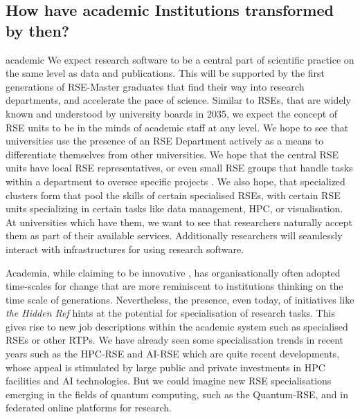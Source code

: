 \documentclass{eceasst}
\begin{document}
\subsection{How have academic Institutions transformed by then?}
\begin{whatis}{}{academic}
We expect research software to be a central part of scientific practice on the same level as data and publications.
This will be supported by the first generations of RSE-Master graduates that find their way into research departments, and accelerate the pace of science.
Similar to RSEs, that are widely known and understood by university boards in 2035, we expect the concept of RSE units to be in the minds
of academic staff at any level.
We hope to see that universities use the presence of an RSE Department actively as a means to differentiate themselves from other universities.
We hope that the central RSE units have local RSE representatives, or even small RSE groups that handle tasks within a department to oversee specific projects \cite{Kempf2025-draft}.
We also hope, that specialized clusters form that pool the skills of certain specialised RSEs, with certain RSE units specializing in certain tasks like data management, HPC, or visualisation.
At universities which have them, we want to see that researchers naturally accept them as part of their available services.
Additionally researchers will seamlessly interact with infrastructures for using research software.
\end{whatis}
Academia, while claiming to be innovative \cite{wzvgbayern}, has organisationally often adopted time-scales for change that are more reminiscent to institutions thinking on the time scale of generations.
Nevertheless, the presence, even today, of initiatives like \emph{the Hidden Ref} \cite{hiddenref} hints at the potential for specialisation of research tasks. This gives rise to new job descriptions within the academic system such as specialised RSEs or other RTPs.
We have already seen some specialisation trends in recent years such as
the HPC-RSE and AI-RSE which are quite recent developments, whose appeal is stimulated by large public and private investments in HPC facilities and AI technologies.
But we could imagine new RSE specialisations emerging in the fields
of quantum computing, such as the Quantum-RSE, and in federated online platforms for research.
\end{document}
